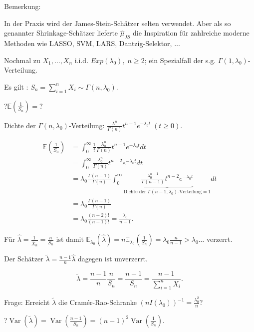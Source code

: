 \documentclass{tstextbook}
\DeclareMathOperator{\Var}{Var}
\newcommand{\E}{\mathbb E}
\begin{document}
	\begin{remark}
		Bemerkung: 
		
		In der Praxis wird der James-Stein-Schätzer selten verwendet. Aber als so genannter Shrinkage-Schätzer lieferte $ \hat{\mu}_{JS} $ die Inspiration für zahlreiche moderne Methoden wie LASSO, SVM, LARS, Dantzig-Selektor, $ \ldots $
	\end{remark}

\begin{example}
	Nochmal zu $ X_1,\ldots, X_n $ i.i.d. $ Exp(\lambda_0), \; n \ge 2 $; ein Spezialfall der s.g. $ \Gamma(1,\lambda_0) $-Verteilung. 
	
	Es gilt : $ S_n = \sum_{i=1}^{n}X_i \sim \Gamma(n,\lambda_0) $. 
	
	?$ \E\left(\frac{1}{S_n}\right)= ? $
	
	Dichte der $ \Gamma(n,\lambda_0) $-Verteilung: $ \frac{\lambda^n}{\Gamma(n)}t^{n-1}e^{-\lambda_0t} \; (t\ge0) $.
	
	\[
	\begin{aligned}
		\E\left(\frac{1}{S_n}\right) & = \int_{0}^{\infty}\frac{1}{t}\frac{\lambda_0^n}{\Gamma(n)}t^{n-1}e^{-\lambda_0t}dt \\
		& = \int_{0}^{\infty}\frac{\lambda_0^n}{\Gamma(n)}t^{n-2}e^{-\lambda_0t}dt \\
		& = \lambda_0 \frac{\Gamma(n-1)}{\Gamma(n)}\int_{0}^{\infty}\underbrace{\frac{\lambda_0^{n-1}}{\Gamma(n-1)}t^{n-2}e^{-\lambda_0 t}}_{\text{Dichte der }\Gamma(n-1,\lambda_0)\text{-Verteilung}=1}dt \\
		& = \lambda_0 \frac{\Gamma(n-1)}{\Gamma(n)} \\
		& =  \lambda_0 \frac{(n-2)!}{(n-1)!} = \frac{\lambda_0}{n-1}.
	\end{aligned}
	\]
	
	Für $ \hat{\lambda} = \frac{1}{\bar{X}_n} = \frac{n}{S_n} $ ist damit $ \E_{\lambda_0}(\hat{\lambda}) = n\E_{\lambda_0}\left(\frac{1}{S_n}\right) = \lambda_0 \frac{n}{n-1} > \lambda_0 \ldots $ verzerrt.
	
	Der Schätzer $ \tilde{\lambda} = \frac{n-1}{n}\hat{\lambda} $ dagegen ist unverzerrt. 
	
	\[ \tilde{\lambda} = \frac{n-1}{n}\frac{n}{S_n} = \frac{n-1}{S_n} = \frac{n-1}{\sum_{i=1}^{n}X_i} . \] 
	
	Frage: Erreicht $ \tilde{\lambda} $ die Cramér-Rao-Schranke $ (nI(\lambda_0))^{-1} = \frac{\lambda_0^2}{n} $?
	
	?$ \Var(\tilde{\lambda}) = \Var\left(\frac{n-1}{S_n}\right) = (n-1)^2 \Var\left(\frac{1}{S_n}\right) $. 
	

\end{example}
\end{document}

